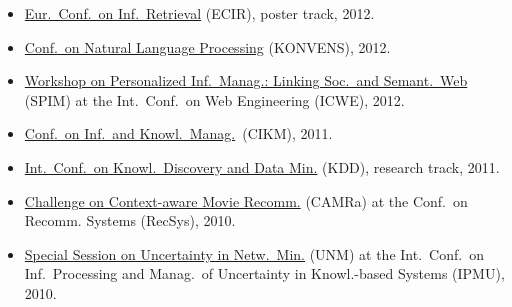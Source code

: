 \documentclass[line,mm]{res}
\newcounter{x}
\newcounter{y}
\begin{document}
\begin{resume}
\begin{itemize}
{  Anal.\ and Tools for Online Community Manag.}\ (MAMA), at
  INFORMATIK, 2013
\item \href{http://ecir2012.upf.edu/}{Eur.\ Conf.\ on Inf.\ Retrieval} (ECIR), poster track, 2012.  
\item \href{http://www.oegai.at/konvens2012/}{Conf.\ on Natural Language
  Processing} (KONVENS), 2012. 
\item \href{http://spim-workshop.org/}{Workshop on Personalized
  Inf.\ Manag.: Linking Soc.\ and Semant.\ Web} (SPIM) at the
  Int.\ Conf.\ on Web Engineering (ICWE), 2012. 
\item \href{http://www.cikm2011.org/}{Conf.\ on Inf.\ and Knowl.\ Manag.}\ (CIKM), 2011.
\item \href{http://www.sigkdd.org/kdd/2011/}{Int.\ Conf.\ on 
  Knowl.\ Discovery and Data Min.} (KDD), research track, 2011.
\item \href{http://www.dai-labor.de/camra2010/}{Challenge on
  Context-aware Movie Recomm.} (CAMRa) at the Conf.\ on  
  Recomm. Systems (RecSys), 2010.   
\item \href{http://www.dai-labor.de/unm2010/}{Special Session on Uncertainty in Netw.\ Min.} (UNM) at the
  Int.\ Conf.\ on Inf.\ Processing and Manag.\ of
  Uncertainty in Knowl.-based Systems (IPMU), 2010. 
\end{itemize}


\end{resume}
\end{document}
